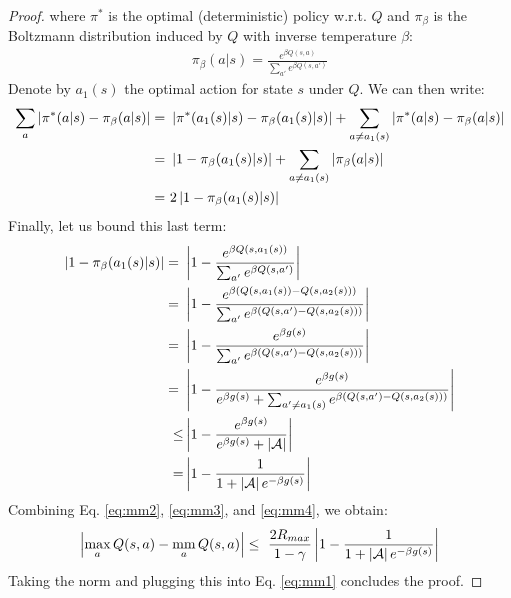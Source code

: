 \documentclass{article}
\newcommand{\mm}{\operatornamewithlimits{mm}}
\newcommand{\abs}[1]{\left\lvert #1 \right\rvert}
\begin{document}
\begin{proof}
where $\pi^*$ is the optimal (deterministic) policy w.r.t. $Q$ and $\pi_{\beta}$ is the Boltzmann distribution induced by $Q$ with inverse temperature $\beta$:
\begin{align*}
\pi_{\beta}(a|s) = \frac{e^{\beta Q(s,a)}}{\sum_{a'}e^{\beta Q(s,a')}}
\end{align*}
Denote by $a_1(s)$ the optimal action for state $s$ under $Q$. We can then write:
\begin{align} \label{eq:mm3}
\sum_a\abs{\pi^*(a|s) - \pi_{\beta}(a|s)} =\ & \abs{\pi^*(a_1(s)|s) - \pi_{\beta}(a_1(s)|s)} + \sum_{a \neq a_1(s)}\abs{\pi^*(a|s) - \pi_{\beta}(a|s)}\notag\\ =\ & \abs{1 - \pi_{\beta}(a_1(s)|s)} + \sum_{a \neq a_1(s)}\abs{\pi_{\beta}(a|s)}\notag\\ =\ & 2\abs{1 - \pi_{\beta}(a_1(s)|s)}
\end{align}
Finally, let us bound this last term:
\begin{align} \label{eq:mm4}
\abs{1 - \pi_{\beta}(a_1(s)|s)} =\ & \abs{1 - \frac{e^{\beta Q(s,a_1(s))}}{\sum_{a'}e^{\beta Q(s,a')}}}\notag\\ =\ & \abs{1 - \frac{e^{\beta \left( Q(s,a_1(s)) - Q(s,a_2(s)) \right)}}{\sum_{a'}e^{\beta \left( Q(s,a') - Q(s,a_2(s))\right)}}}\notag\\ =\ & \abs{1 - \frac{e^{\beta g(s)}}{\sum_{a'}e^{\beta \left( Q(s,a') - Q(s,a_2(s))\right)}}}\notag\\ =\ & \abs{1 - \frac{e^{\beta g(s)}}{e^{\beta g(s)} + \sum_{a' \neq a_1(s)}e^{\beta \left( Q(s,a') - Q(s,a_2(s))\right)}}}\notag\\ \leq & \abs{1 - \frac{e^{\beta g(s)}}{e^{\beta g(s)} + \abs{\mathcal{A}}}}\notag\\ = & \abs{1 - \frac{1}{1 + \abs{\mathcal{A}}e^{-\beta g(s)}}}
\end{align}
Combining Eq. \eqref{eq:mm2}, \eqref{eq:mm3}, and \eqref{eq:mm4}, we obtain:
\begin{align*}
\abs{\max_a Q(s,a) - \mm_a Q(s,a)} \leq\ \frac{2R_{max}}{1-\gamma}\abs{1 - \frac{1}{1 + \abs{\mathcal{A}}e^{-\beta g(s)}}}
\end{align*}
Taking the norm and plugging this into Eq. \eqref{eq:mm1} concludes the proof.
\end{proof}
\end{document}
